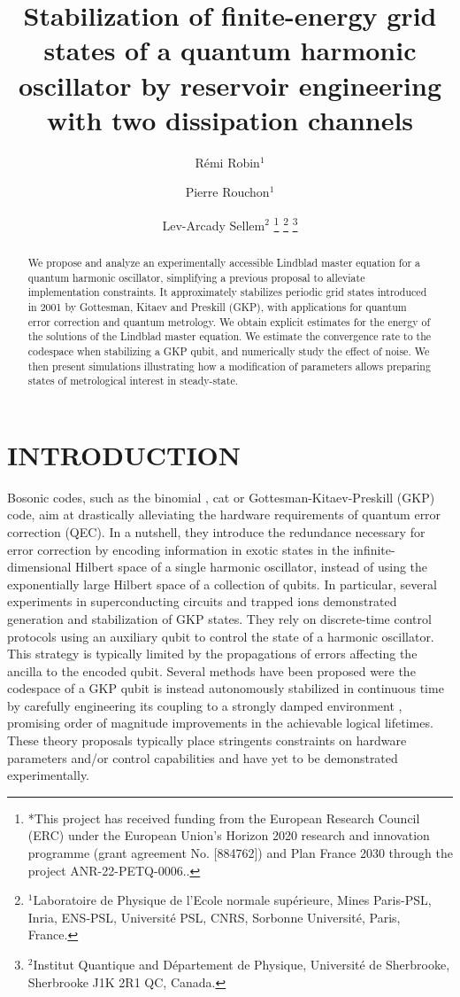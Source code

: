 \documentclass[a4paper, 11pt]{article}
\title{Stabilization of finite-energy grid states of a quantum harmonic oscillator by reservoir engineering with two dissipation channels}
\author{Rémi Robin$^{1}$ \and Pierre Rouchon$^{1}$ \and Lev-Arcady Sellem$^{2}$%
\thanks{*This project has received funding from the European Research Council (ERC) under the European Union’s Horizon 2020 research and innovation programme (grant agreement No. [884762]) and Plan France 2030 through
the project ANR-22-PETQ-0006..}%
\thanks{$^{1}$Laboratoire  de Physique de l’Ecole normale sup\'{e}rieure, Mines Paris-PSL, Inria,  ENS-PSL, Universit\'{e} PSL, CNRS, Sorbonne Universit\'{e},  Paris, France.}%
\thanks{$^{2}$Institut Quantique and Département de Physique, Université de Sherbrooke, Sherbrooke J1K 2R1 QC, Canada.}%
}
\begin{document}
\maketitle

\begin{abstract}


We propose and analyze an experimentally accessible Lindblad master equation for a quantum harmonic oscillator, simplifying a previous proposal to alleviate implementation constraints. It approximately stabilizes periodic grid states introduced in 2001 by Gottesman, Kitaev
and Preskill (GKP), with applications for quantum error correction and quantum metrology.
We obtain explicit estimates for the energy of
the solutions of the Lindblad master equation.
We estimate the convergence rate to the codespace when stabilizing a GKP qubit, and numerically study the effect of noise.
We then present simulations illustrating how a modification of parameters allows preparing states of metrological interest in steady-state.

\end{abstract}
\section{INTRODUCTION}
Bosonic codes, such as
the binomial
\cite{MichaelSilveriBrierleyEtAl2016},
cat \cite{cochraneMacroscopicallyDistinctQuantumsuperposition1999} or Gottesman-Kitaev-Preskill (GKP) \cite{gottesmanEncodingQubitOscillator2001} code,
aim at drastically alleviating the hardware requirements of quantum error correction (QEC). In a nutshell, they introduce the redundance necessary for error correction by encoding information in exotic states in the infinite-dimensional Hilbert space of a single harmonic oscillator, instead of using the exponentially large Hilbert space of a collection of qubits.
In particular, several experiments in superconducting circuits
\cite{campagne-ibarcqQuantumErrorCorrection2020,NeeveGKP2022,sivakRealtimeQuantumError2023a,brockQuantumErrorCorrection2024,lachance-quirion_2024}
and trapped ions \cite{fluhmannEncodingQubitTrappedion2019,NeeveGKP2022,matsosRobustDeterministicPreparation2023}
demonstrated generation and stabilization of GKP states. They rely on discrete-time control protocols using an auxiliary qubit to control the state of a harmonic oscillator. This strategy is typically limited by the propagations of errors affecting the ancilla to the encoded qubit.
Several methods have been proposed were the codespace of a GKP qubit is instead autonomously stabilized in continuous time by carefully engineering its coupling to a strongly damped environment
\cite{sellemDissipativeProtectionGKP2025,sellemStabilityDecoherence2023,sellemExponentialConvergenceDissipative2022a,nathanSelfCorrectingGottesmanKitaevPreskillQubit2025,geierSelfcorrectingGKPQubit2024}, promising order of magnitude improvements in the achievable logical lifetimes.
These theory proposals typically place stringents constraints on hardware parameters and/or control capabilities and have yet to be demonstrated experimentally.
\end{document}
